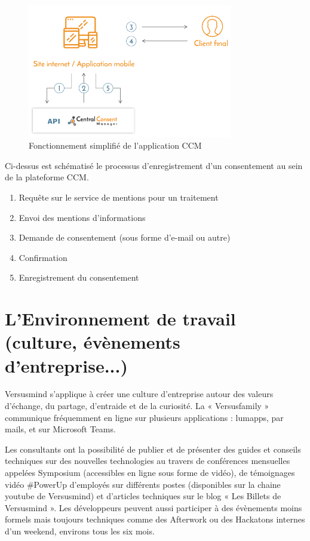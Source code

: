 \documentclass[12pt, a4paper]{report}
\newcommand\tab[1][1cm]{\hspace*{#1}}
\begin{document}
\begin{figure}[H]
    \begin{center}
        \includegraphics[width=0.8\textwidth]{ccm5.png}
    \end{center}
    \caption{Fonctionnement simplifié de l'application CCM}
\end{figure}
Ci-dessus est schématisé le processus d’enregistrement d’un consentement au sein de la plateforme CCM.
\begin{enumerate}
    \item Requête sur le service de mentions pour un traitement
    \item Envoi des mentions d'informations
    \item Demande de consentement (sous forme d'e-mail ou autre)
    \item Confirmation
    \item Enregistrement du consentement
\end{enumerate}

\section{L’Environnement de travail (culture, évènements d’entreprise...)}
\tab{}Versusmind s’applique à créer une culture d’entreprise autour des valeurs d’échange, du partage,
d’entraide et de la curiosité. La « Versusfamily » communique fréquemment en ligne sur plusieurs
applications : lumapps, par mails, et sur Microsoft Teams.\newline

Les consultants ont la possibilité de publier et de présenter des guides et conseils techniques sur des
nouvelles technologies au travers de conférences mensuelles appelées Symposium (accessibles en
ligne sous forme de vidéo), de témoignages vidéo \#PowerUp d’employés sur différents postes
(disponibles sur la chaine youtube de Versusmind) et d’articles techniques sur le blog « Les Billets de
Versusmind ». Les développeurs peuvent aussi participer à des évènements moins formels mais
toujours techniques comme des Afterwork ou des Hackatons internes d’un weekend, environs tous les
six mois.\newline
\end{document}
